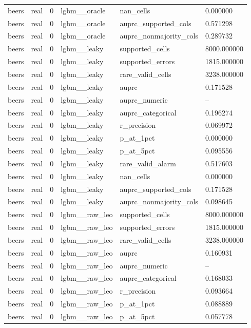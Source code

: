 \begin{tabular}{llllll}
beers & real & 0 & lgbm\_\_oracle & nan\_cells & 0.000000 \\
beers & real & 0 & lgbm\_\_oracle & auprc\_supported\_cols & 0.571298 \\
beers & real & 0 & lgbm\_\_oracle & auprc\_nonmajority\_cols & 0.289732 \\
beers & real & 0 & lgbm\_\_leaky & supported\_cells & 8000.000000 \\
beers & real & 0 & lgbm\_\_leaky & supported\_errors & 1815.000000 \\
beers & real & 0 & lgbm\_\_leaky & rare\_valid\_cells & 3238.000000 \\
beers & real & 0 & lgbm\_\_leaky & auprc & 0.171528 \\
beers & real & 0 & lgbm\_\_leaky & auprc\_numeric & -- \\
beers & real & 0 & lgbm\_\_leaky & auprc\_categorical & 0.196274 \\
beers & real & 0 & lgbm\_\_leaky & r\_precision & 0.069972 \\
beers & real & 0 & lgbm\_\_leaky & p\_at\_1pct & 0.000000 \\
beers & real & 0 & lgbm\_\_leaky & p\_at\_5pct & 0.095556 \\
beers & real & 0 & lgbm\_\_leaky & rare\_valid\_alarm & 0.517603 \\
beers & real & 0 & lgbm\_\_leaky & nan\_cells & 0.000000 \\
beers & real & 0 & lgbm\_\_leaky & auprc\_supported\_cols & 0.171528 \\
beers & real & 0 & lgbm\_\_leaky & auprc\_nonmajority\_cols & 0.098645 \\
beers & real & 0 & lgbm\_\_raw\_leo & supported\_cells & 8000.000000 \\
beers & real & 0 & lgbm\_\_raw\_leo & supported\_errors & 1815.000000 \\
beers & real & 0 & lgbm\_\_raw\_leo & rare\_valid\_cells & 3238.000000 \\
beers & real & 0 & lgbm\_\_raw\_leo & auprc & 0.160931 \\
beers & real & 0 & lgbm\_\_raw\_leo & auprc\_numeric & -- \\
beers & real & 0 & lgbm\_\_raw\_leo & auprc\_categorical & 0.168033 \\
beers & real & 0 & lgbm\_\_raw\_leo & r\_precision & 0.093664 \\
beers & real & 0 & lgbm\_\_raw\_leo & p\_at\_1pct & 0.088889 \\
beers & real & 0 & lgbm\_\_raw\_leo & p\_at\_5pct & 0.057778 \\

\end{tabular}

